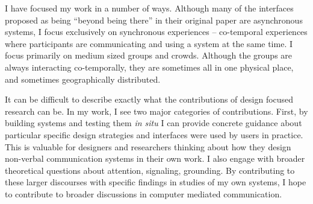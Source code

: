 \documentclass{tufte-handout}
\begin{document}

I have focused my work in a number of ways. Although many of the interfaces proposed as being ``beyond being there'' in their original paper are asynchronous systems, I focus exclusively on synchronous experiences -- co-temporal experiences where participants are communicating and using a system at the same time. I focus primarily on medium sized groups and crowds. Although the groups are always interacting co-temporally, they are sometimes all in one physical place, and sometimes geographically distributed. 

It can be difficult to describe exactly what the contributions of design focused research can be. In my work, I see two major categories of contributions. First, by building systems and testing them \emph{in situ} I can provide concrete guidance about particular specific design strategies and interfaces were used by users in practice. This is valuable for designers and researchers thinking about how they design non-verbal communication systems in their own work. I also engage with broader theoretical questions about attention, signaling, grounding. By contributing to these larger discourses with specific findings in studies of my own systems, I hope to contribute to broader discussions in computer mediated communication. 



\end{document}
